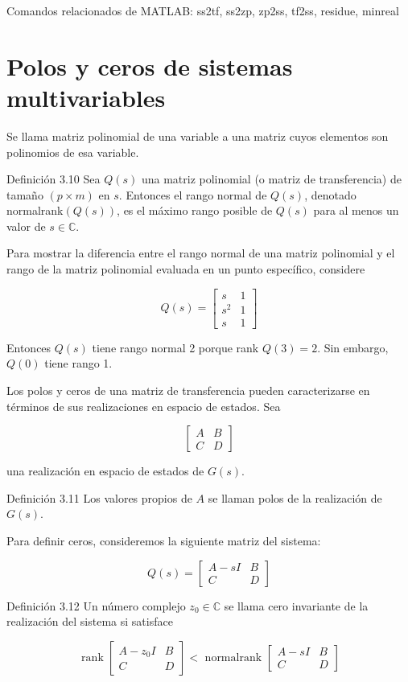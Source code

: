 Comandos relacionados de MATLAB: ss2tf, ss2zp, zp2ss, tf2ss, residue, minreal

\section{Polos y ceros de sistemas multivariables}
Se llama matriz polinomial de una variable a una matriz cuyos elementos son polinomios de esa variable.

Definición 3.10 Sea $Q(s)$ una matriz polinomial (o matriz de transferencia) de tamaño $(p \times m)$ en $s$. Entonces el rango normal de $Q(s)$, denotado normalrank$(Q(s))$, es el máximo rango posible de $Q(s)$ para al menos un valor de $s \in \mathbb{C}$.

Para mostrar la diferencia entre el rango normal de una matriz polinomial y el rango de la matriz polinomial evaluada en un punto específico, considere

$$
Q(s)=\left[\begin{array}{cc}
s & 1 \\
s^{2} & 1 \\
s & 1
\end{array}\right]
$$

Entonces $Q(s)$ tiene rango normal 2 porque rank $Q(3)=2$. Sin embargo, $Q(0)$ tiene rango 1.

Los polos y ceros de una matriz de transferencia pueden caracterizarse en términos de sus realizaciones en espacio de estados. Sea

$$
\left[\begin{array}{c|c}
A & B \\
\hline C & D
\end{array}\right]
$$

una realización en espacio de estados de $G(s)$.

Definición 3.11 Los valores propios de $A$ se llaman polos de la realización de $G(s)$.

Para definir ceros, consideremos la siguiente matriz del sistema:

$$
Q(s)=\left[\begin{array}{cc}
A-s I & B \\
C & D
\end{array}\right]
$$

Definición 3.12 Un número complejo $z_{0} \in \mathbb{C}$ se llama cero invariante de la realización del sistema si satisface

$$
\operatorname{rank}\left[\begin{array}{cc}
A-z_{0} I & B \\
C & D
\end{array}\right]<\text { normalrank }\left[\begin{array}{cc}
A-s I & B \\
C & D
\end{array}\right]
$$

